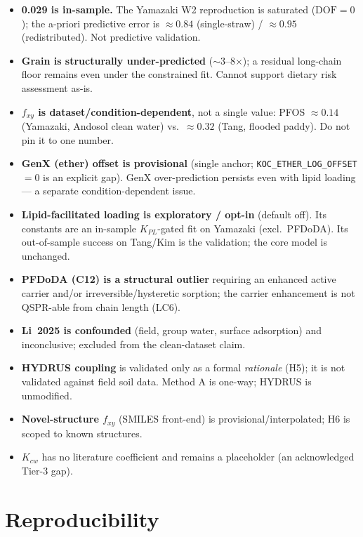 \documentclass[11pt]{article}
\begin{document}
\begin{itemize}
  \item \textbf{0.029 is in-sample.} The Yamazaki W2 reproduction is
        saturated ($\mathrm{DOF}=0$); the a-priori predictive error is
        $\approx 0.84$ (single-straw) / $\approx 0.95$
        (redistributed). Not predictive validation.
  \item \textbf{Grain is structurally under-predicted}
        ($\sim$3--8$\times$); a residual long-chain floor remains even
        under the constrained fit. Cannot support dietary risk
        assessment as-is.
  \item \textbf{$f_{xy}$ is dataset/condition-dependent}, not a single
        value: PFOS $\approx 0.14$ (Yamazaki, Andosol clean water)
        vs.\ $\approx 0.32$ (Tang, flooded paddy). Do not pin it to
        one number.
  \item \textbf{GenX (ether) offset is provisional} (single anchor;
        \texttt{KOC\_ETHER\_LOG\_OFFSET}$=0$ is an explicit gap). GenX
        over-prediction persists even with lipid loading --- a
        separate condition-dependent issue.
  \item \textbf{Lipid-facilitated loading is exploratory / opt-in}
        (default off). Its constants are an in-sample $K_{PL}$-gated
        fit on Yamazaki (excl.\ PFDoDA). Its out-of-sample success on
        Tang/Kim is the validation; the core model is unchanged.
  \item \textbf{PFDoDA (C12) is a structural outlier} requiring an
        enhanced active carrier and/or irreversible/hysteretic
        sorption; the carrier enhancement is not QSPR-able from chain
        length (LC6).
  \item \textbf{Li~2025 is confounded} (field, group water, surface
        adsorption) and inconclusive; excluded from the clean-dataset
        claim.
  \item \textbf{HYDRUS coupling} is validated only as a formal
        \emph{rationale} (H5); it is not validated against field soil
        data. Method A is one-way; HYDRUS is unmodified.
  \item \textbf{Novel-structure $f_{xy}$} (SMILES front-end) is
        provisional/interpolated; H6 is scoped to known structures.
  \item \textbf{$K_{cw}$} has no literature coefficient and remains a
        placeholder (an acknowledged Tier-3 gap).
\end{itemize}

\section{Reproducibility}
\label{sec:repro}
\end{document}
